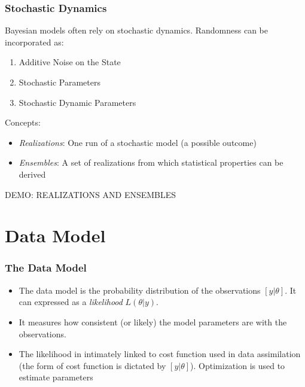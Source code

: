 \documentclass{beamer}
\begin{document}
\frame%
{\frametitle{Stochastic Dynamics}

Bayesian models often rely on stochastic dynamics. Randomness can be incorporated as:
\begin{enumerate}
\pause
\item
Additive Noise on the State
\pause
\item
Stochastic Parameters
\pause
\item
Stochastic Dynamic Parameters
\end{enumerate}

\pause
\medskip
Concepts: 
\begin{itemize}
\pause
\item
{\it Realizations}: One run of a stochastic model (a possible outcome)
\pause
\item
{\it Ensembles}: A set of realizations from which statistical properties can be derived

\end{itemize}

\pause
\medskip
\color{red} DEMO: REALIZATIONS AND ENSEMBLES

}

\section{Data Model}

\frame%
{\frametitle{The Data Model}

\begin{itemize}
\pause
\item
The data model is the probability distribution of the observations $[y|\theta]$. It can expressed as a {\it likelihood} $L(\theta|y)$.
\pause
\item
It measures how consistent (or likely) the model parameters are with the observations. 
\pause
\item
The likelihood in intimately linked to cost function used in data assimilation  (the form of cost function is dictated by $[y|\theta]$). Optimization is used to estimate parameters
\end{itemize}
}
\end{document}
